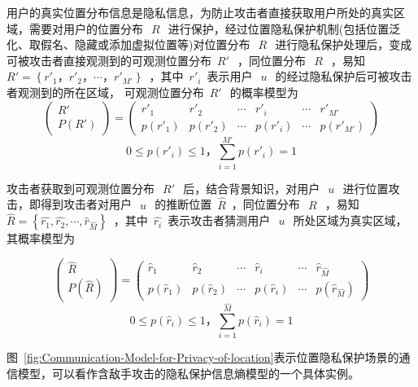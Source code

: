 用户的真实位置分布信息是隐私信息，为防止攻击者直接获取用户所处的真实区域，需要对用户的位置分布~$~R~$~进行保护，经过位置隐私保护机制(包括位置泛化、取假名、隐藏或添加虚拟位置等)对位置分布~$~R~$~进行隐私保护处理后，变成可被攻击者直接观测到的可观测位置分布~${R}'~$~，同位置分布~$~R~$~，易知~${R}'=\left \{ {r}'_{1}，{r}'_{2}，\cdots ，{r}'_{{M}'} \right \}$~，其中~${r}'_{i}$~表示用户~$~u~$~的经过隐私保护后可被攻击者观测到的所在区域， 可观测位置分布~${R}'~$~的概率模型为
\begin{equation}
\begin{pmatrix}
R{}'\\ 
P({R}')
\end{pmatrix}=\begin{pmatrix}
{r}'_{1} & {r}'_{2} & \cdots  & {r}'_{i} & \cdots  & {r}'_{{M}'}\\ 
p({r}'_{1})& p({r}'_{2}) & \cdots & p({r}'_{i}) & \cdots & p({r}'_{{M}'})
\end{pmatrix}
\end{equation}
\begin{equation}
0\leq p({r}'_{i})\leq1，\sum_{i=1}^{M{}'}p({r}'_{i})=1
\end{equation}

攻击者获取到可观测位置分布~$~R{}'~$~后，结合背景知识，对用户~$~u~$~进行位置攻击，即得到攻击者对用户~$~u~$~的推断位置~$\hat{R}$~，同位置分布~$~R~$~，易知~$\hat{R}=\left \{ \hat{r_{1}},\hat{r_{2}},\cdots ,\hat{r}_{\hat{M}} \right \}$~，其中~$\hat{r_{i}}$~表示攻击者猜测用户~$~u~$~所处区域为真实区域， 其概率模型为

\begin{equation}
\begin{pmatrix}
\hat{R}\\ 
P(\hat{R})
\end{pmatrix}=\begin{pmatrix}
\hat{r}_{1} & \hat{r}_{2} & \cdots  & \hat{r}_{i} & \cdots  & \hat{r}_{\hat{M}}\\ 
p(\hat{r}_{1})& p(\hat{r}_{2}) & \cdots & p(\hat{r}_{i}) & \cdots & p(\hat{r}_{\hat{M}})
\end{pmatrix}
\end{equation}
\begin{equation}
0\leq p(\hat{r}_{i})\leq 1，\sum_{i=1}^{\hat{M}}p(\hat{r}_{i})=1
\end{equation}

图~\ref{fig:Communication-Model-for-Privacy-of-location}表示位置隐私保护场景的通信模型，可以看作含敌手攻击的隐私保护信息熵模型的一个具体实例。

